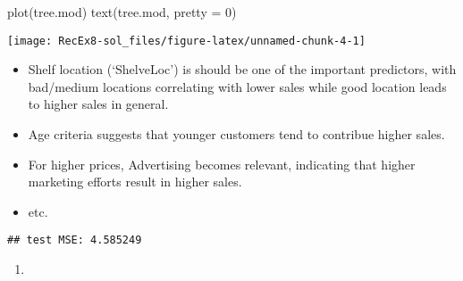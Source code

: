 \documentclass[
]{article}
\newenvironment{Shaded}{\begin{snugshade}}{\end{snugshade}}
\newcommand{\AttributeTok}[1]{\textcolor[rgb]{0.77,0.63,0.00}{#1}}
\newcommand{\DecValTok}[1]{\textcolor[rgb]{0.00,0.00,0.81}{#1}}
\newcommand{\FunctionTok}[1]{\textcolor[rgb]{0.00,0.00,0.00}{#1}}
\newcommand{\NormalTok}[1]{#1}
\newcommand{\OtherTok}[1]{\textcolor[rgb]{0.56,0.35,0.01}{#1}}
\newcommand{\SpecialCharTok}[1]{\textcolor[rgb]{0.00,0.00,0.00}{#1}}
\newcommand{\StringTok}[1]{\textcolor[rgb]{0.31,0.60,0.02}{#1}}
\providecommand{\tightlist}{%
  \setlength{\itemsep}{0pt}\setlength{\parskip}{0pt}}
\begin{document}
\begin{Shaded}
\begin{Highlighting}[]
\FunctionTok{plot}\NormalTok{(tree.mod)}
\FunctionTok{text}\NormalTok{(tree.mod, }\AttributeTok{pretty =} \DecValTok{0}\NormalTok{)}
\end{Highlighting}
\end{Shaded}

\texttt{[image: RecEx8-sol\_files/figure-latex/unnamed-chunk-4-1]}

\begin{itemize}
\tightlist
\item
  Shelf location (`ShelveLoc') is should be one of the important
  predictors, with bad/medium locations correlating with lower sales
  while good location leads to higher sales in general.
\item
  Age criteria suggests that younger customers tend to contribue higher
  sales.
\item
  For higher prices, Advertising becomes relevant, indicating that
  higher marketing efforts result in higher sales.
\item
  etc.
\end{itemize}

\begin{Shaded}
\end{Shaded}

\begin{verbatim}
## test MSE: 4.585249
\end{verbatim}

\begin{enumerate}
\def\labelenumi{\alph{enumi})}
\setcounter{enumi}{2}
\tightlist
\item
\end{enumerate}
\end{document}
